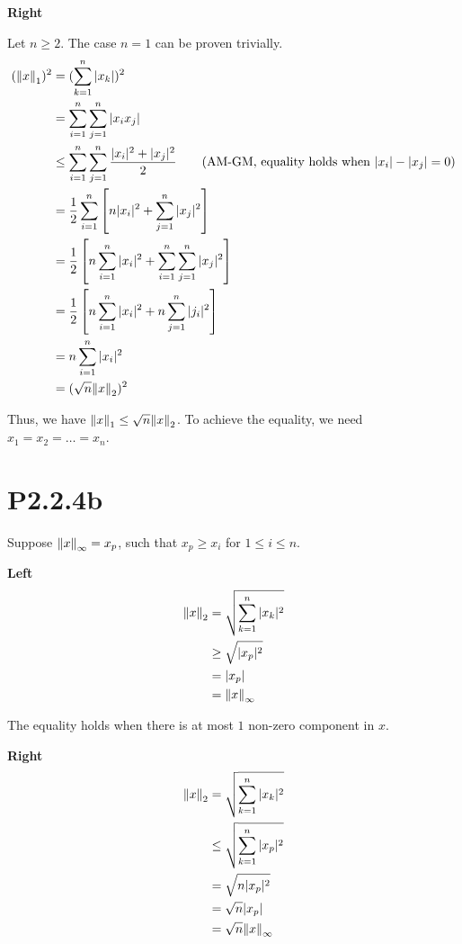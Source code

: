 \documentclass{article}
\begin{document}
\textbf{Right}

Let $n\ge 2$. The case $n=1$ can be proven trivially.
\begin{align*}
    (\norm{x}_1)^2 & = (\sum_{k=1}^n |x_k|)^2                                                                                    \\
                   & =\sum_{i=1}^n\sum_{j=1}^n |x_ix_j|                                                                          \\
                   & \le \sum_{i=1}^n\sum_{j=1}^n \frac{|x_i|^2+|x_j|^2}{2}  \tag*{(AM-GM, equality holds when $|x_i|-|x_j|=0$)} \\
                   & = \frac{1}{2}\sum_{i=1}^n\left[n|x_i|^2+\sum_{j=1}^n|x_j|^2 \right]                                         \\
                   & =\frac{1}{2}\left[n\sum_{i=1}^n|x_i|^2+\sum_{i=1}^n\sum_{j=1}^n|x_j|^2\right]                               \\
                   & =\frac{1}{2}\left[n\sum_{i=1}^n|x_i|^2+n\sum_{j=1}^n|j_i|^2\right]                                          \\
                   & =n\sum_{i=1}^n|x_i|^2                                                                                       \\
                   & = (\sqrt{n}\norm{x}_2)^2
\end{align*}

Thus, we have $\norm{x}_1 \le \sqrt{n}\norm{x}_2$. To achieve the equality,
we need ${x_1=x_2=\dots=x_n}$.

\section*{P2.2.4b}
Suppose $\norm{x}_\infty=x_p$, such that $x_p \ge x_i$ for $1 \le i \le n$.

\textbf{Left}
\begin{align*}
    \norm{x}_2 & = \sqrt{\sum_{k=1}^n|x_k|^2} \\
               & \ge \sqrt{|x_p|^2}           \\
               & =|x_p|                       \\
               & = \norm{x}_\infty
\end{align*}

The equality holds when there is at most $1$ non-zero component in $x$.

\textbf{Right}
\begin{align*}
    \norm{x}_2 & =\sqrt{\sum_{k=1}^n|x_k|^2}     \\
               & \le \sqrt{\sum_{k=1}^n |x_p|^2} \\
               & = \sqrt{n|x_p|^2}               \\
               & = \sqrt{n}|x_p|                 \\
               & = \sqrt{n}\norm{x}_\infty
\end{align*}
\end{document}
